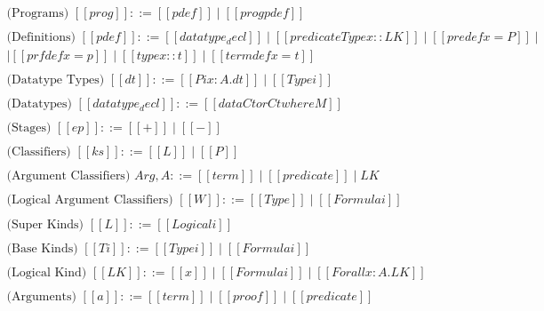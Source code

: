 


\renewcommand{\Sepdrulename}[1]{\scriptsize \textsc{#1}}
\renewcommand{\SepUdrulename}[1]{\scriptsize \textsc{#1}}
\newcommand{\Sep}[0]{\text{Sep}^3}

\begin{center}
  \small
  \begin{math}
    \begin{array}{llllllllllllllll}
      \text{(Programs) }    [[prog]] ::= [[pdef]] \mid [[prog pdef]]\\
      \\
      \text{(Definitions) } [[pdef]] ::= [[datatype_decl]] \mid [[predicateType x :: LK]] \mid
      [[predef x = P]] \mid \\
      [[theorem x :: P]] \mid [[prfdef x = p]] \mid [[type x :: t]] \mid [[termdef x = t]] \\
      \\
      \text{(Datatype Types) } [[dt]] ::= [[Pi x : A . dt]] \mid [[Type i]]\\
      \\
      \text{(Datatypes) }   [[datatype_decl]] ::= [[data Ctor C t where M]]\\
      \\
      \text{(Stages) }      [[ep]]   ::= [[+]] \mid [[-]]\\
      \\
      \text{(Classifiers) } [[ks]]   ::= [[L]] \mid [[P]]\\
      \\
      \text{(Argument Classifiers) } Arg, A ::= [[term]] \mid [[predicate]] \mid LK\\
      \\
      \text{(Logical Argument Classifiers) } [[W]] ::= [[Type]] \mid [[Formula i]]\\
      \\
      \text{(Super Kinds) } [[L]] ::= [[Logical i]]\\
      \\
      \text{(Base Kinds) }  [[Ti]] ::= [[Type i]] \mid [[Formula i]]\\
      \\
      \text{(Logical Kind) } [[LK]] ::= [[x]] \mid [[Formula i]] \mid [[Forall x : A.LK]]\\
      \\
      \text{(Arguments) } [[a]] ::= [[term]] \mid [[proof]] \mid [[predicate]]\\

\end{array}
\end{math}
\end{center}

